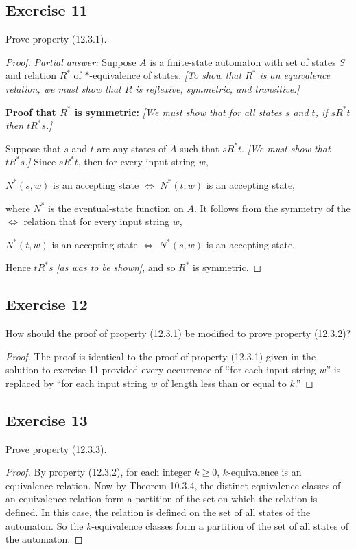 \documentclass[14pt]{extarticle}
\begin{document}
\subsection{Exercise 11}
Prove property (12.3.1).
\begin{proof}
{\it Partial answer:} Suppose \(A\) is a finite-state automaton with set of states \(S\) and relation \(R^*\) of 
\(*\)-equivalence of states. {\it [To show that \(R^*\) is an equivalence relation, we must show that \(R\) is reflexive, 
symmetric, and transitive.]}

{\bf Proof that \(R^*\) is symmetric:} {\it [We must show that for all states \(s\) and \(t\), if \(sR^*t\) then \(tR^*s\).]}

Suppose that \(s\) and \(t\) are any states of \(A\) such that \(sR^*t\). {\it [We must show that \(tR^*s\).]} Since 
\(sR^*t\), then for every input string \(w\),

\(N^*(s, w)\) is an accepting state \(\iff\) \(N^*(t, w)\) is an accepting state,

where \(N^*\) is the eventual-state function on \(A\). It follows from the symmetry of the \(\iff\) relation that for 
every input string \(w\), 

\(N^*(t, w)\) is an accepting state \(\iff\) \(N^*(s, w)\) is an accepting state.

Hence \(tR^*s\) {\it [as was to be shown]}, and so \(R^*\) is symmetric.
\end{proof}

\subsection{Exercise 12}
How should the proof of property (12.3.1) be modified to prove property (12.3.2)?

\begin{proof}
The proof is identical to the proof of property (12.3.1) given in the solution to exercise 11 provided every occurrence of 
“for each input string \(w\)” is replaced by “for each input string \(w\) of length less than or equal to \(k\).”
\end{proof}

\subsection{Exercise 13}
Prove property (12.3.3).
\begin{proof}
By property (12.3.2), for each integer \(k \geq 0\), \(k\)-equivalence is an equivalence relation. Now by Theorem 10.3.4, 
the distinct equivalence classes of an equivalence relation form a partition of the set on which the relation is defined. 
In this case, the relation is defined on the set of all states of the automaton. So the \(k\)-equivalence classes form a 
partition of the set of all states of the automaton.
\end{proof}
\end{document}
